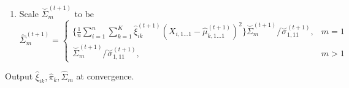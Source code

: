 \documentclass[11pt]{article}
\newcommand{\wh}{\widehat}
\begin{document}
\begin{algorithm}
\begin{algorithmic}[1]
\begin{enumerate}
\begin{enumerate}
                   \item Scale \(\overset\smile\Sigma^{(t+1)}_m\) to be 
                   \[\wh\Sigma^{(t+1)}_m=\begin{cases}
                       \{\frac{1}{n}\sum^n_{i=1}\sum^K_{k=1}\wh\xi^{(t+1)}_{ik}(X_{i,1\dots1}-\wh\mu^{(t+1)}_{k,1\dots 1})^2\}\overset\smile\Sigma^{(t+1)}_m/\overset\smile\sigma^{(t+1)}_{1,11}, & m=1\\
                       \overset\smile\Sigma^{(t+1)}_m/\overset\smile\sigma^{(t+1)}_{1,11}, & m>1
                   \end{cases}\]
               \end{enumerate}
       \end{enumerate}
        \EndFor
        \State Output \(\wh\xi_{ik}, \wh\pi_k, \wh\Sigma_m\) at convergence.
    \end{algorithmic}
\end{algorithm}
\end{document}
